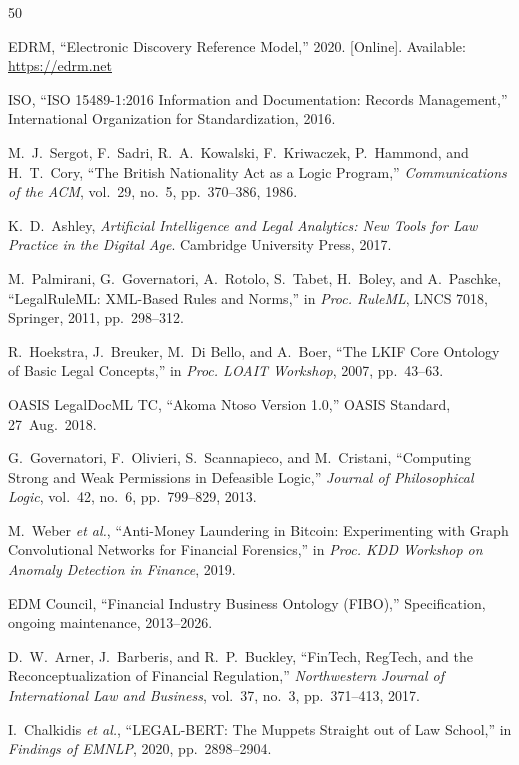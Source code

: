 \documentclass{ieeeaccess}
\begin{document}
\begin{thebibliography}{50}

EDRM, ``Electronic Discovery Reference Model,'' 2020. [Online]. Available: \url{https://edrm.net}

ISO, ``ISO 15489-1:2016 Information and Documentation: Records Management,'' International Organization for Standardization, 2016.

M.~J.~Sergot, F.~Sadri, R.~A.~Kowalski, F.~Kriwaczek, P.~Hammond, and H.~T.~Cory, ``The British Nationality Act as a Logic Program,'' \textit{Communications of the ACM}, vol.~29, no.~5, pp.~370--386, 1986.

K.~D.~Ashley, \textit{Artificial Intelligence and Legal Analytics: New Tools for Law Practice in the Digital Age}. Cambridge University Press, 2017.

M.~Palmirani, G.~Governatori, A.~Rotolo, S.~Tabet, H.~Boley, and A.~Paschke, ``LegalRuleML: XML-Based Rules and Norms,'' in \textit{Proc. RuleML}, LNCS 7018, Springer, 2011, pp.~298--312.

R.~Hoekstra, J.~Breuker, M.~Di Bello, and A.~Boer, ``The LKIF Core Ontology of Basic Legal Concepts,'' in \textit{Proc. LOAIT Workshop}, 2007, pp.~43--63.

OASIS LegalDocML TC, ``Akoma Ntoso Version 1.0,'' OASIS Standard, 27~Aug.~2018.

G.~Governatori, F.~Olivieri, S.~Scannapieco, and M.~Cristani, ``Computing Strong and Weak Permissions in Defeasible Logic,'' \textit{Journal of Philosophical Logic}, vol.~42, no.~6, pp.~799--829, 2013.

M.~Weber \textit{et al.}, ``Anti-Money Laundering in Bitcoin: Experimenting with Graph Convolutional Networks for Financial Forensics,'' in \textit{Proc. KDD Workshop on Anomaly Detection in Finance}, 2019.

EDM Council, ``Financial Industry Business Ontology (FIBO),'' Specification, ongoing maintenance, 2013--2026.

D.~W.~Arner, J.~Barberis, and R.~P.~Buckley, ``FinTech, RegTech, and the Reconceptualization of Financial Regulation,'' \textit{Northwestern Journal of International Law and Business}, vol.~37, no.~3, pp.~371--413, 2017.

I.~Chalkidis \textit{et al.}, ``LEGAL-BERT: The Muppets Straight out of Law School,'' in \textit{Findings of EMNLP}, 2020, pp.~2898--2904.


\end{thebibliography}
\end{document}
